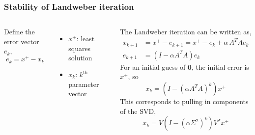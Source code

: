 \documentclass[xcolor={dvipsnames}]{beamer}
\begin{document}
\begin{frame}
\frametitle{Stability of Landweber iteration}
\begin{columns}
Define the error vector $e_k$,
$$e_k = x^+ - x_k$$
\begin{itemize}
    \item $x^+$: least squares solution 
    \item $x_k$:  $k^\text{th}$ parameter vector
\end{itemize}
The Landweber iteration can be written as,
\begin{align*}
x_{k+1}& = x^+ - e_{k+1} = x^+ - e_k + \alpha \, A^T A e_k \\
e_{k+1}& = (I - \alpha A^T A) e_k
\end{align*}
For an initial guess of $\mathbf{0}$, the initial error is $x^+$, so
$$ x_{k} = (I - (\alpha A^T A)^k) x^+ $$
This corresponds to pulling in components of the SVD,
$$  x_{k} = V (I - (\alpha \Sigma^2)^k) V^T x^+  $$
\end{columns}
\end{frame}









% 

% 
\end{document}
